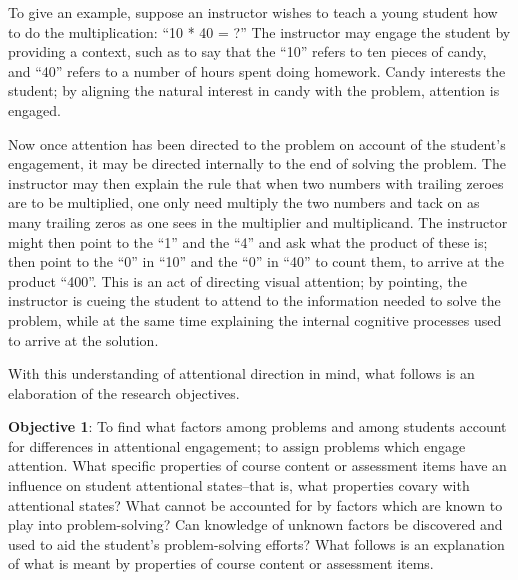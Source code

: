 \documentclass[hidelinks,11pt]{article}
\begin{document}
To give an example, suppose an instructor wishes to teach a young student how
to do the multiplication: ``10 * 40 = ?'' The instructor may engage the student
by providing a context, such as to say that the ``10'' refers to ten pieces of
candy, and ``40'' refers to a number of hours spent doing homework. Candy
interests the student; by aligning the natural interest in candy with the
problem, attention is engaged. 

Now once attention has been directed to the problem on account of the student's
engagement, it may be directed internally to the end of solving the problem.
The instructor may then explain the rule that when two numbers with trailing
zeroes are to be multiplied, one only need multiply the two numbers and tack on
as many trailing zeros as one sees in the multiplier and multiplicand.  The
instructor might then point to the ``1'' and the ``4'' and ask what the product
of these is; then point to the ``0'' in ``10'' and the ``0'' in ``40'' to count
them, to arrive at the product ``400''.  This is an act of directing visual
attention; by pointing, the instructor is cueing the student to attend to the
information needed to solve the problem, while at the same time explaining the
internal cognitive processes used to arrive at the solution.
 
With this understanding of attentional direction in mind, what follows is
an elaboration of the research objectives.

\textbf{Objective 1}: To find what factors among problems and among students
account for differences in attentional engagement; to assign problems which
engage attention. What specific properties of course content or assessment
items have an influence on student attentional states--that is, what properties
covary with attentional states? What cannot be accounted for by factors which
are known to play into problem-solving? Can knowledge of unknown factors be
discovered and used to aid the student’s problem-solving efforts? What follows
is an explanation of what is meant by properties of course content or
assessment items.
\end{document}
